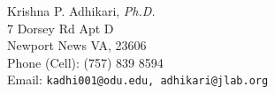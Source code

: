 \documentclass[10pt, letterpaper]{article}
\newcommand{\cd}{$\cdot${ }}
\begin{document}






{\LARGE Krishna P. Adhikari, \emph{Ph.D. }} \\[.5cm]
7 Dorsey Rd Apt D \\
Newport News VA, 23606 \\
Phone (Cell): (757) 839 8594 \\
Email: \texttt{kadhi001@odu.edu, adhikari@jlab.org} \\




\end{document}
